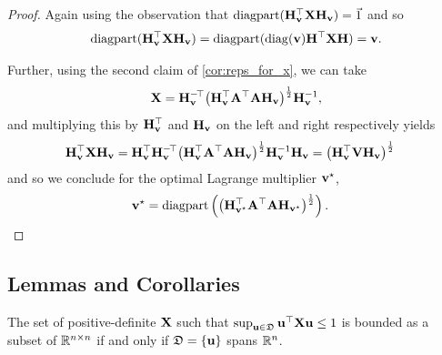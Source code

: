 \begin{proof}
Again using the observation that $\diagpart(\Hv\tp \bfX \Hv) = \vec{1}$ and so 
$$\diagpart(\Hv\tp \bfX \Hv) = \diagpart(\diagv\bfH\tp \bfX \bfH) = \dualv.$$

Further, using the second claim of \cref{cor:reps_for_x}, we can take
\[
\bfX = \Hv\tpinv \big(\Hv\tp \AAT \Hv\big)\hlf \Hv\inv,
\]
and multiplying this by $\Hv\tp$ and $\Hv$ on the left and right respectively yields
\begin{align*}
\Hv\tp \bfX \Hv 
 &= \Hv\tp \Hv\tpinv \big(\Hv\tp \AAT \Hv\big)\hlf \Hv\inv \Hv 
 = \big(\Hv\tp \bfV \Hv\big)\hlf
\end{align*}
and so we conclude for the optimal Lagrange multiplier $\vopt$,
\begin{align}
\vopt 
  &= \diagpart\left(\big(\Hvopt\tp \AAT \Hvopt\big)\hlf\right).
\end{align}
\end{proof}

\subsection{Lemmas and Corollaries}\label{app:ssec:finite-minimizer}

\begin{lem}\label{lem:finite_minimizer}
The set of positive-definite $\bfX$ such that $\sup_{\contrib \in \deltaset} \contrib\tp\bfX\contrib \leq 1$ is bounded as a subset of $\R^\dimdim$ if and only if $\deltaset=\{\contrib\}$ spans $\R^n$.
\end{lem}

